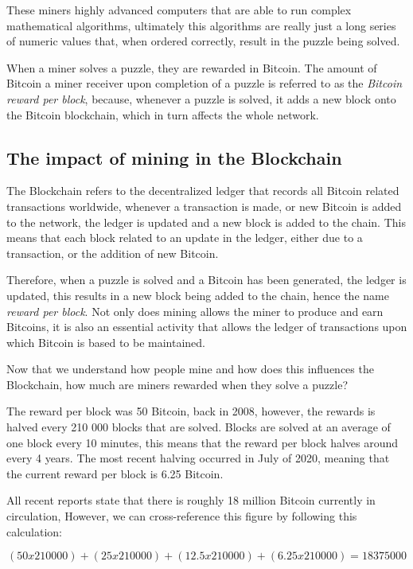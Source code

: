 \documentclass{article}
\newcommand\tab[1][1cm]{\hspace*{#1}}
\begin{document}
These miners highly advanced computers that are able to run complex mathematical algorithms, ultimately this algorithms are really just a long series of numeric values that, when ordered correctly, result in the puzzle being solved.

When a miner solves a puzzle, they are rewarded in Bitcoin. The amount of Bitcoin a miner receiver upon completion of a puzzle is referred to as the \textit{Bitcoin reward per block}, because, whenever a puzzle is solved, it adds a new block onto the Bitcoin blockchain, which in turn affects the whole network.

\subsection{The impact of mining in the Blockchain}

\tab The Blockchain refers to the decentralized ledger that records all Bitcoin related transactions worldwide, whenever a transaction is made, or new Bitcoin is added to the network, the ledger is updated and a new block is added to the chain. This means that each block related to an update in the ledger, either due to a transaction, or the addition of new Bitcoin.

Therefore, when a puzzle is solved and a Bitcoin has been generated, the ledger is updated, this results in a new block being added to the chain, hence the name \textit{reward per block}. Not only does mining allows the miner to produce and earn Bitcoins, it is also an essential activity that allows the ledger of transactions upon which Bitcoin is based to be maintained.

Now that we understand how people mine and how does this influences the Blockchain, how much are miners rewarded when they solve a puzzle?

The reward per block was 50 Bitcoin, back in 2008, however, the rewards is halved every 210 000 blocks that are solved. Blocks are solved at an average of one block every 10 minutes, this means that the reward per block halves around every 4 years. The most recent halving occurred in July of 2020, meaning that the current reward per block is 6.25 Bitcoin.

All recent reports state that there is roughly 18 million Bitcoin currently in circulation, However, we can cross-reference this figure by following this calculation:

\[(50 x 210 000) + (25 x 210 000) + (12.5 x 210 000) + (6.25 x 210 000) = 18 375 000\]
\end{document}
